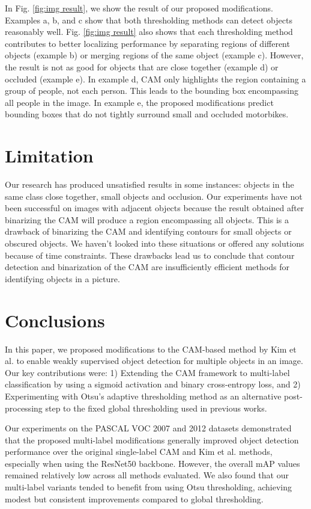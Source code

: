 \documentclass[conference]{IEEEtran}
\begin{document}
In Fig. \ref{fig:img result}, we show the result of our proposed modifications. Examples a, b, and c show that both thresholding methods can detect objects reasonably well. Fig. \ref{fig:img result} also shows that each thresholding method contributes to better localizing performance by separating regions of different objects (example b) or merging regions of the same object (example c). However, the result is not as good for objects that are close together (example d) or occluded (example e). In example d, CAM only highlights the region containing a group of people, not each person. This leads to the bounding box encompassing all people in the image. In example e, the proposed modifications predict bounding boxes that do not tightly surround small and occluded motorbikes.


\section{Limitation}
Our research has produced unsatisfied results in some instances: objects in the same class close together, small objects and occlusion. Our experiments have not been successful on images with adjacent objects because the result obtained after binarizing the CAM will produce a region encompassing all objects. This is a drawback of binarizing the CAM and identifying contours for small objects or obscured objects. We haven't looked into these situations or offered any solutions because of time constraints. These drawbacks lead us to conclude that contour detection and binarization of the CAM are insufficiently efficient methods for identifying objects in a picture.

\section{Conclusions}
In this paper, we proposed modifications to the CAM-based method by Kim et al. \cite{kim2022bridging} to enable weakly supervised object detection for multiple objects in an image. Our key contributions were: 1) Extending the CAM framework to multi-label classification by using a sigmoid activation and binary cross-entropy loss, and 2) Experimenting with Otsu's adaptive thresholding method \cite{otsu} as an alternative post-processing step to the fixed global thresholding used in previous works.

Our experiments on the PASCAL VOC 2007 and 2012 datasets demonstrated that the proposed multi-label modifications generally improved object detection performance over the original single-label CAM and Kim et al. methods, especially when using the ResNet50 backbone. However, the overall mAP values remained relatively low across all methods evaluated. We also found that our multi-label variants tended to benefit from using Otsu thresholding, achieving modest but consistent improvements compared to global thresholding.
\end{document}
